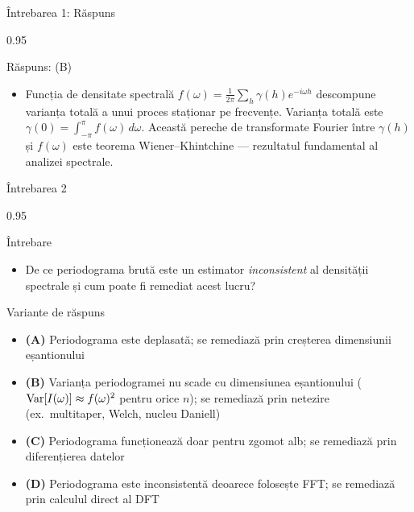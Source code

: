 \documentclass[9pt, aspectratio=169, t]{beamer}
\begin{document}
\begin{frame}{Întrebarea 1: Răspuns}
    \begin{cminipage}{0.95\textwidth}
    \vspace{-0.3cm}
    {\small
    \begin{exampleblock}{Răspuns: (B)}
    \begin{itemize}\setlength{\itemsep}{0pt}
        \item Funcția de densitate spectrală $f(\omega) = \frac{1}{2\pi}\sum_{h} \gamma(h)e^{-i\omega h}$ descompune varianța totală a unui proces staționar pe frecvențe. Varianța totală este $\gamma(0) = \int_{-\pi}^{\pi} f(\omega)\,d\omega$. Această pereche de transformate Fourier între $\gamma(h)$ și $f(\omega)$ este teorema Wiener--Khintchine --- rezultatul fundamental al analizei spectrale.
    \end{itemize}
    \end{exampleblock}
    }
    \hfill{}
    \end{cminipage}
\end{frame}

\begin{frame}{Întrebarea 2}
    \begin{cminipage}{0.95\textwidth}
    \begin{alertblock}{Întrebare}
        \begin{itemize}\setlength{\itemsep}{0pt}
            \item De ce periodograma brută este un estimator \textit{inconsistent} al densității spectrale și cum poate fi remediat acest lucru?
        \end{itemize}
    \end{alertblock}

    \vspace{0.3cm}

    \begin{block}{Variante de răspuns}
        \begin{itemize}\setlength{\itemsep}{2pt}
            \item \textcolor{MainBlue}{\textbf{(A)}} Periodograma este deplasată; se remediază prin creșterea dimensiunii eșantionului
            \item \textcolor{MainBlue}{\textbf{(B)}} Varianța periodogramei nu scade cu dimensiunea eșantionului ($\text{Var}[I(\omega)] \approx f(\omega)^2$ pentru orice $n$); se remediază prin netezire (ex.\ multitaper, Welch, nucleu Daniell)
            \item \textcolor{MainBlue}{\textbf{(C)}} Periodograma funcționează doar pentru zgomot alb; se remediază prin diferențierea datelor
            \item \textcolor{MainBlue}{\textbf{(D)}} Periodograma este inconsistentă deoarece folosește FFT; se remediază prin calculul direct al DFT
        \end{itemize}
    \end{block}
    \end{cminipage}
\end{frame}
\end{document}
